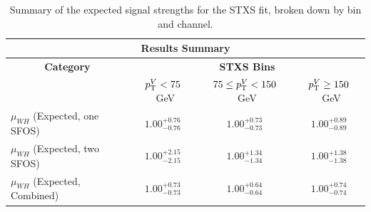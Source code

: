 \begin{table}[htp]
    \centering
    \begin{tabular}{l|c|c|c}
      \hline
      \multicolumn{4}{c}{\textbf{Results Summary}} \\
      \hline
      \multicolumn{1}{c|}{\textbf{Category}} & \multicolumn{3}{c}{\textbf{STXS Bins}} \\
      & $p_{\mathrm{T}}^{V} < 75$~GeV & $75 \leq p_{\mathrm{T}}^{V} < 150$~GeV & $p_{\mathrm{T}}^{V} \geq 150$~GeV \\
      \hline
      $\mu_{WH}$ (Expected, one SFOS) & $1.00^{+0.76}_{-0.76}$ & $1.00^{+0.73}_{-0.73}$ & $1.00^{+0.89}_{-0.89}$ \\
      \hline
      $\mu_{WH}$ (Expected, two SFOS) & $1.00^{+2.15}_{-2.15}$ & $1.00^{+1.34}_{-1.34}$ & $1.00^{+1.38}_{-1.38}$ \\
      \hline
      $\mu_{WH}$ (Expected, Combined) & $1.00^{+0.73}_{-0.73}$ & $1.00^{+0.64}_{-0.64}$ & $1.00^{+0.74}_{-0.74}$ \\
      \hline
    \end{tabular}
    \caption{Summary of the expected signal strengths for the \zh{} STXS fit, broken down by \ptv{} bin and channel.}\label{tab:zh_stxs_results_summary}
  \end{table}